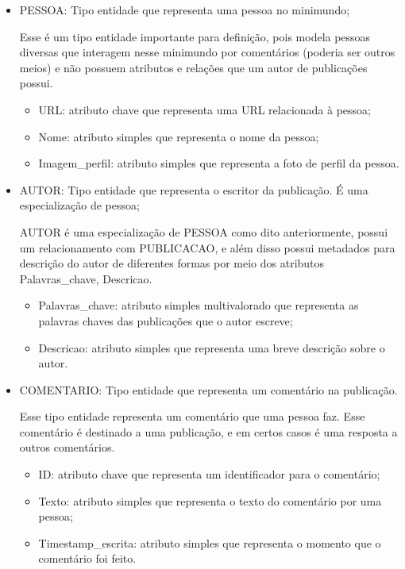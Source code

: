 \begin{itemize}

\item PESSOA: Tipo entidade que representa uma pessoa no minimundo;

				Esse é um tipo entidade importante para definição, pois modela pessoas diversas que interagem nesse minimundo por comentários (poderia ser outros meios) e não possuem atributos e relações que um autor de publicações possui.
\begin{itemize}
\item URL: atributo chave que representa uma URL relacionada à pessoa;
\item Nome: atributo simples que representa o nome da pessoa;
\item Imagem\_perfil: atributo simples que representa a foto de perfil da pessoa.
\end{itemize}
\end{itemize}
\begin{itemize}
\item AUTOR: Tipo entidade que representa o escritor da publicação. É uma especialização de pessoa;

				AUTOR é uma especialização de PESSOA como dito anteriormente, possui um relacionamento com PUBLICACAO, e além disso possui metadados para descrição do autor de diferentes formas por meio dos atributos Palavras\_chave, Descricao.
				\begin{itemize}
\item Palavras\_chave: atributo simples multivalorado que representa as palavras chaves das publicações que o autor escreve;
\item Descricao: atributo simples que representa uma breve descrição sobre o autor.
				\end{itemize}
				\end{itemize}
				\begin{itemize}
\item COMENTARIO: Tipo entidade que representa um comentário na publicação.

				Esse tipo entidade representa um comentário que uma pessoa faz. Esse comentário é destinado a uma publicação, e em certos casos é uma resposta a outros comentários.
				\begin{itemize}
\item ID: atributo chave que representa um identificador para o comentário;
\item Texto: atributo simples que representa o texto do comentário por uma pessoa;
\item Timestamp\_escrita: atributo simples que representa o momento que o comentário foi feito.
				\end{itemize}
				\end{itemize}
